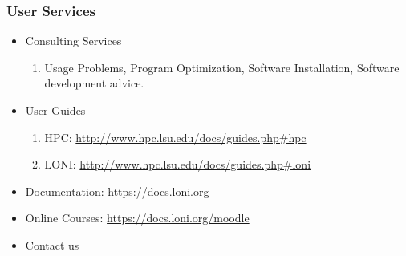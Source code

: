 \documentclass[slidestop,mathserif,compress,xcolor=svgnames,table]{beamer}
\newcommand*\vardiamond{\textcolor{tigerspurple}{%
  \ensuremath{\blacklozenge}}}
\begin{document}
\begin{frame}
  \frametitle{\small User Services}
  \begin{itemize}
    \item Consulting Services
    \begin{enumerate}
      \item[$\vardiamond$] Usage Problems, Program Optimization, Software Installation, Software development advice. 
    \end{enumerate}
    \item User Guides
    \begin{enumerate}
      \item[$\vardiamond$]HPC: \url{http://www.hpc.lsu.edu/docs/guides.php\#hpc}
      \item[$\vardiamond$]LONI: \url{http://www.hpc.lsu.edu/docs/guides.php\#loni}
    \end{enumerate}
  \item Documentation: \url{https://docs.loni.org}
  \item Online Courses: \url{https://docs.loni.org/moodle}
  \item Contact us
  \end{itemize}
\end{frame}
\end{document}
